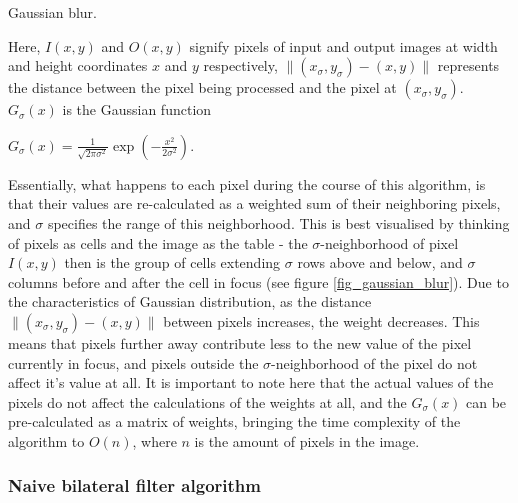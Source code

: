 \documentclass [12pt,a4paper]{report}
\begin{document}
\begin{center}
\begin{algorithm}[h]
\caption{Gaussian blur.}
\label{algorithm_gaussian_blur}
\end{algorithm}
\end{center}

Here, $I(x,y)$ and $O(x,y)$ signify pixels of input and output images at width and height coordinates $x$ and $y$ respectively, $\| (x_\sigma, y_\sigma)-(x, y) \|$ represents the distance between the pixel being processed and the pixel at $(x_\sigma, y_\sigma)$. $G_\sigma(x)$ is the Gaussian function
\begin{center}
$G_\sigma(x) = \frac{1}{\sqrt{2\pi\sigma^2}} \exp(-\frac{x^2}{2\sigma^2})$.
\end{center}

Essentially, what happens to each pixel during the course of this algorithm, is that their values are re-calculated as a weighted sum of their neighboring pixels, and $\sigma$ specifies the range of this neighborhood. This is best visualised by thinking of pixels as cells and the image as the table - the $\sigma$-neighborhood of pixel $I(x,y)$ then is the group of cells extending $\sigma$ rows above and below, and $\sigma$ columns before and after the cell in focus (see figure \ref{fig_gaussian_blur}). Due to the characteristics of Gaussian distribution, as the distance $\| (x_\sigma, y_\sigma)-(x, y) \|$ between pixels increases, the weight decreases. This means that pixels further away contribute less to the new value of the pixel currently in focus, and pixels outside the $\sigma$-neighborhood of the pixel do not affect it's value at all. It is important to note here that the actual values of the pixels do not affect the calculations of the weights at all, and the $G_\sigma(x)$ can be pre-calculated as a matrix of weights, bringing the time complexity of the algorithm to $O(n)$, where $n$ is the amount of pixels in the image.

\subsubsection{Naive bilateral filter algorithm}
\label{bilateral_filter}
\end{document}
